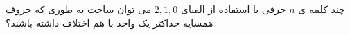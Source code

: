 \exercise
چند کلمه ی
$n$
حرفی با استفاده از الفبای 
${2, 1, 0}$
می توان ساخت به طوری که حروف همسایه حداکثر یک واحد با هم اختلاف داشته باشند؟